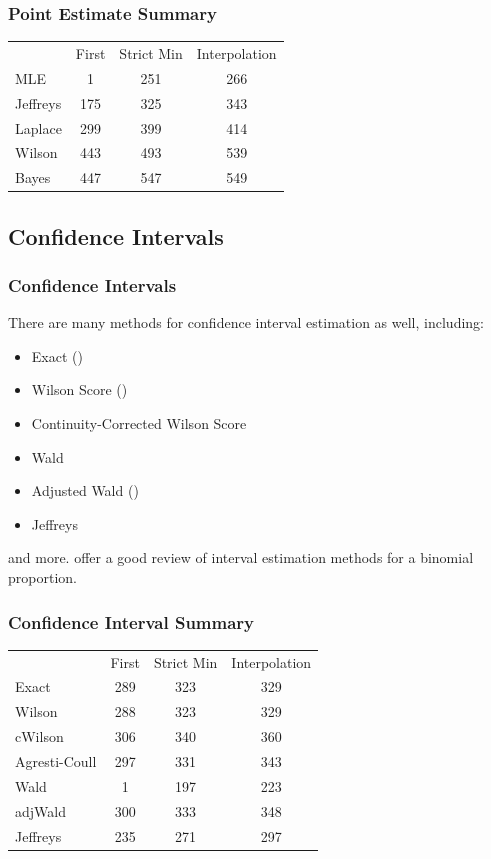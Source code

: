 \documentclass{beamer}\usepackage{knitr}
\begin{document}
\begin{frame}[fragile]
\frametitle{Point Estimate Summary}
\begin{center}
  \begin{tabular}{lccc}
              & First & Strict Min & Interpolation \\
    MLE       & 1 & 251 & 266 \\
    Jeffreys  & 175 & 325 & 343 \\
    Laplace   & 299 & 399 & 414 \\
    Wilson    & 443 & 493 & 539 \\
    Bayes     & 447 & 547 & 549 \\
  \end{tabular}
\end{center}
\end{frame}


\subsection{Confidence Intervals}

\begin{frame}
  \frametitle{Confidence Intervals}
  
  There are many methods for confidence interval estimation as well, including:
  \begin{itemize}
    \item Exact (\cite{Clopper1934})
    \item Wilson Score (\cite{Wilson1927})
    \item Continuity-Corrected Wilson Score
    \item Wald
    \item Adjusted Wald (\cite{Agresti1998})
    \item Jeffreys
  \end{itemize}
  and more. \cite{Agresti1998} offer a good review of interval estimation methods for a binomial proportion.
  
\end{frame}


\begin{frame}[fragile]
\frametitle{Confidence Interval Summary}
\begin{center}
  \begin{tabular}{lccc}
              & First & Strict Min & Interpolation \\
    Exact     & 289 & 323 & 329 \\
    Wilson    & 288 & 323 & 329 \\
    cWilson   & 306 & 340 & 360 \\
    Agresti-Coull   & 297 & 331 & 343 \\
    Wald      & 1 & 197 & 223 \\
    adjWald   & 300 & 333 & 348 \\
    Jeffreys  & 235 & 271 & 297 \\
  \end{tabular}
\end{center}
\end{frame}
\end{document}
